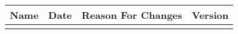 \documentclass[../main.tex]{subfiles}
\begin{document}
    \begin{center}
        \begin{tabular}{|c|c|c|c|}
            \hline
    	    Name & Date & Reason For Changes & Version\\
            \hline
    	     & & & \\
            \hline
        \end{tabular}
    \end{center}
\end{document}
